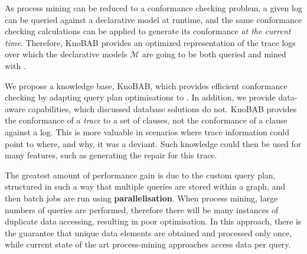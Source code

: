 As process mining can be reduced to a conformance checking problem, a given log can be queried against a declarative model at runtime, and the same conformance checking calculations can be applied to generate its conformance \emph{at the current time}. Therefore, KnoBAB provides an optimized representation of the trace logs over which the declarative models $\mathcal{M}$ are going to be both queried and mined with \LTLf.

We propose a knowledge base, KnoBAB, which provides efficient conformance checking by adapting query plan optimisations \cite{BellatrecheKB21} to \LTLf. In addition, we provide data-aware capabilities, which discussed database solutions do not. KnoBAB provides the conformance of a \emph{trace} to a set of clauses, not the conformance of a clause against a log. This is more valuable in scenarios where trace information could point to where, and why, it was a deviant. Such knowledge could then be used for many features, such as generating the repair for this trace.
\medskip
 

The greatest amount of performance gain is due to the custom query plan, structured in such a way that multiple queries are stored within a graph, and then batch jobs are run using \textbf{parallelisation}. When process mining, large numbers of queries are performed, therefore there will be many instances of duplicate data accessing, resulting in poor optimisation. In this approach, there is the guarantee that unique data elements are obtained and processed only once, while current state of the art process-mining approaches access data per query. 
